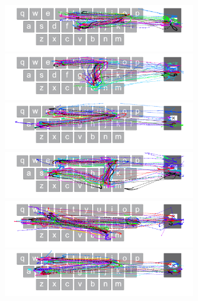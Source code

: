 \begin{figure}[t]
    \centering
	\begin{minipage}[t]{8in}
	\hspace{-20pt}
	\begin{minipage}[t]{3.1in}
		\includegraphics[width=3.3in]{Figures/fig_got_paths}
	\end{minipage}
	\begin{minipage}[t]{3in}
		\includegraphics[width=3.3in]{Figures/fig_rub_paths}
	\end{minipage}
	\end{minipage}
	
	\begin{minipage}[t]{8in}
	\hspace{-20pt}
	\begin{minipage}[t]{3.1in}
		\includegraphics[width=3.3in]{Figures/fig_sir_paths}
	\end{minipage}
	\begin{minipage}[t]{3in}
		\includegraphics[width=3.3in]{Figures/fig_rind_paths}
	\end{minipage}
	\end{minipage}
	
	\begin{minipage}[t]{8in}
	\hspace{-20pt}
	\begin{minipage}[t]{3.1in}
		\includegraphics[width=3.3in]{Figures/fig_lane_paths}
	\end{minipage}
	\begin{minipage}[t]{3in}
		\includegraphics[width=3.3in]{Figures/fig_sire_paths}
	\end{minipage}
	\end{minipage}
	

\end{figure}
